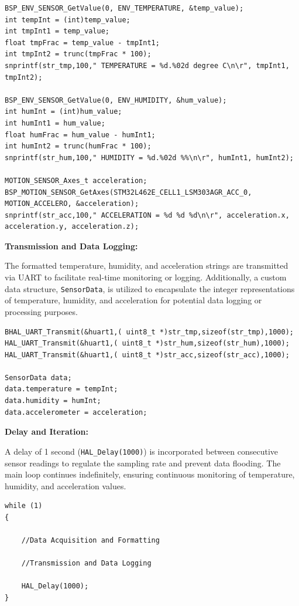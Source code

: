 \begin{lstlisting}[caption={Data Acquisition and Formatting}]
BSP_ENV_SENSOR_GetValue(0, ENV_TEMPERATURE, &temp_value);
int tempInt = (int)temp_value;
int tmpInt1 = temp_value;
float tmpFrac = temp_value - tmpInt1;
int tmpInt2 = trunc(tmpFrac * 100);
snprintf(str_tmp,100," TEMPERATURE = %d.%02d degree C\n\r", tmpInt1, tmpInt2);

BSP_ENV_SENSOR_GetValue(0, ENV_HUMIDITY, &hum_value);
int humInt = (int)hum_value;
int humInt1 = hum_value;
float humFrac = hum_value - humInt1;
int humInt2 = trunc(humFrac * 100);
snprintf(str_hum,100," HUMIDITY = %d.%02d %%\n\r", humInt1, humInt2);

MOTION_SENSOR_Axes_t acceleration;
BSP_MOTION_SENSOR_GetAxes(STM32L462E_CELL1_LSM303AGR_ACC_0, MOTION_ACCELERO, &acceleration);
snprintf(str_acc,100," ACCELERATION = %d %d %d\n\r", acceleration.x, acceleration.y, acceleration.z);
\end{lstlisting}

\textbf{Transmission and Data Logging:}

The formatted temperature, humidity, and acceleration strings are transmitted via UART to facilitate real-time monitoring or logging.
Additionally, a custom data structure, \lstinline{SensorData}, is utilized to encapsulate the integer representations of temperature, humidity, and acceleration for potential data logging or processing purposes.

\begin{lstlisting}[caption={Transmission and Data Logging}]
BHAL_UART_Transmit(&huart1,( uint8_t *)str_tmp,sizeof(str_tmp),1000);
HAL_UART_Transmit(&huart1,( uint8_t *)str_hum,sizeof(str_hum),1000);
HAL_UART_Transmit(&huart1,( uint8_t *)str_acc,sizeof(str_acc),1000);

SensorData data;
data.temperature = tempInt;
data.humidity = humInt;
data.accelerometer = acceleration;
\end{lstlisting}

\textbf{Delay and Iteration:}

A delay of 1 second (\lstinline{HAL_Delay(1000)}) is incorporated between consecutive sensor readings to regulate the sampling rate and prevent data flooding.
The main loop continues indefinitely, ensuring continuous monitoring of temperature, humidity, and acceleration values.

\begin{lstlisting}[caption={Delay and Iteration}]
while (1)
{

    //Data Acquisition and Formatting
    
    //Transmission and Data Logging
    
    HAL_Delay(1000);
}
\end{lstlisting}

